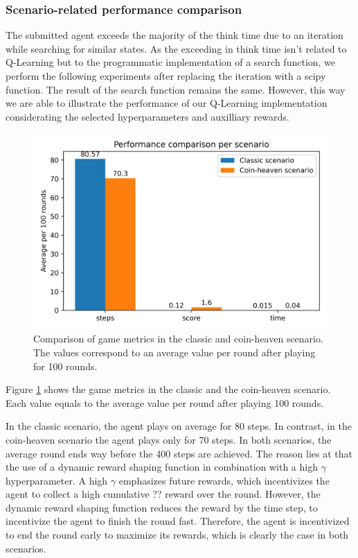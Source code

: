 \documentclass[
	letterpaper, %
	12pt, %
]{CSUniSchoolLabReport}
\begin{document}
\subsubsection{Scenario-related performance comparison \AB}
The submitted agent exceeds the majority of the think time due to an iteration while searching for
similar states.
As the exceeding in think time isn't related to Q-Learning but to the programmatic implementation of a search function,
we perform the following experiments after replacing the iteration with a scipy function.
The result of the search function remains the same.
However, this way we are able to illustrate the performance of our Q-Learning implementation
considerating the selected hyperparameters and auxilliary rewards.


\begin{figure}[H]
	\centering
	\includegraphics[scale=0.6]{Figures/metrics.png}
	\caption{Comparison of game metrics in the classic and coin-heaven scenario. The values
		correspond to an average value per round after playing for 100 rounds.}
	\label{img:metrics}
\end{figure}

Figure \ref{img:metrics} shows the game metrics in the classic and the coin-heaven
scenario. Each value equals to the average value per round after playing 100 rounds.

In the classic scenario, the agent plays on average for 80 steps. In contrast, in the
coin-heaven scenario the agent plays only for 70 steps. In both scenarios, the
average round ends way before the 400 steps are achieved. The reason lies at that
the use of a dynamic reward shaping function in combination with a high $\gamma$ hyperparameter.
A high $\gamma$ emphasizes future rewards, which incentivizes the agent to collect a high cumulative ?? reward
over the round. However, the dynamic reward shaping function reduces the reward by the time step,
to incentivize the agent to finish the round fast. Therefore, the agent is incentivized to end the
round early to maximize its rewards, which is clearly the case in both scenarios.
\end{document}
